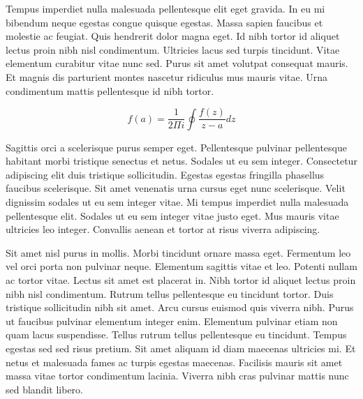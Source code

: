 \documentclass{article}
\begin{document}
    Tempus imperdiet nulla malesuada pellentesque elit eget gravida. In eu mi bibendum neque egestas congue quisque egestas. Massa sapien faucibus et molestie ac feugiat. Quis hendrerit dolor magna eget. Id nibh tortor id aliquet lectus proin nibh nisl condimentum. Ultricies lacus sed turpis tincidunt. Vitae elementum curabitur vitae nunc sed. Purus sit amet volutpat consequat mauris. Et magnis dis parturient montes nascetur ridiculus mus mauris vitae. Urna condimentum mattis pellentesque id nibh tortor.
    
    \begin{equation}
    	f\left ( a \right ) = \frac{1}{2\Pi i} \oint \frac{f\left ( z \right )}{z-a} dz
    \end{equation}
    
    Sagittis orci a scelerisque purus semper eget. Pellentesque pulvinar pellentesque habitant morbi tristique senectus et netus. Sodales ut eu sem integer. Consectetur adipiscing elit duis tristique sollicitudin. Egestas egestas fringilla phasellus faucibus scelerisque. Sit amet venenatis urna cursus eget nunc scelerisque. Velit dignissim sodales ut eu sem integer vitae. Mi tempus imperdiet nulla malesuada pellentesque elit. Sodales ut eu sem integer vitae justo eget. Mus mauris vitae ultricies leo integer. Convallis aenean et tortor at risus viverra adipiscing.
    
    Sit amet nisl purus in mollis. Morbi tincidunt ornare massa eget. Fermentum leo vel orci porta non pulvinar neque. Elementum sagittis vitae et leo. Potenti nullam ac tortor vitae. Lectus sit amet est placerat in. Nibh tortor id aliquet lectus proin nibh nisl condimentum. Rutrum tellus pellentesque eu tincidunt tortor. Duis tristique sollicitudin nibh sit amet. Arcu cursus euismod quis viverra nibh. Purus ut faucibus pulvinar elementum integer enim. Elementum pulvinar etiam non quam lacus suspendisse. Tellus rutrum tellus pellentesque eu tincidunt. Tempus egestas sed sed risus pretium. Sit amet aliquam id diam maecenas ultricies mi. Et netus et malesuada fames ac turpis egestas maecenas. Facilisis mauris sit amet massa vitae tortor condimentum lacinia. Viverra nibh cras pulvinar mattis nunc sed blandit libero.
    
\end{document}
